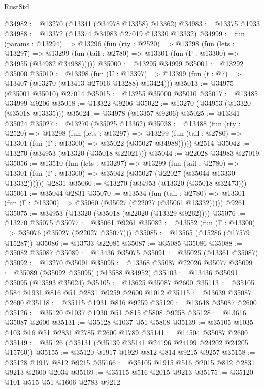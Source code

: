 \begin{lexlean}{RustStd}
\begin{coremodule}
@34982 := @13270 (@13341 (@34978 @13358) @13362)
@34983 := @13375 @1933
@34988 := @13372 (@13374 @34983 @27019 @13330 @13332)
@34999 := fun (params : @13294) =>
  @13296
    (fun (rty : @2520) =>
    @13298
      (fun (lets : @13297) =>
      @13299 (fun (tail : @2780) => @13301 (fun (Γ : @13300) => @34955 (@34982 @34988)))))
@35000 := @13295 @34999
@35001 := @13292 @35000
@35010 := @13398
    (fun (U : @13397) => @13399 (fun (t : @7) => @13407 (@13270 (@13413 @27016 @13288) @13424)))
@35013 := @34975 (@35001 @35010) @27014
@35015 := @13255 @35000 @35010
@35017 := @13485 @34999 @9206
@35018 := @13322 @9206
@35022 := @13270 (@34953 (@13320 (@35018 @13335)))
@35024 := @34978 (@13357 @9206)
@35025 := @13341 @35024
@35027 := @13270 (@35025 @13362)
@35038 := @13488
    (fun (rty : @2520) =>
    @13298
      (fun (lets : @13297) =>
      @13299 (fun (tail : @2780) => @13301 (fun (Γ : @13300) => @35022 (@35027 @34988)))))
    @2514
@35042 := @13270 (@34953 (@13320 (@35018 @22021)))
@35044 := @22028 @34983 @27019
@35056 := @13510
    (fun (lets : @13297) =>
    @13299
      (fun (tail : @2780) =>
      @13301 (fun (Γ : @13300) => @35042 (@35027 (@22027 (@35044 @13330 @13332))))))
    @2831
@35060 := @13270 (@34953 (@13320 (@35018 @32473)))
@35061 := @35044 @2831
@35070 := @13534
    (fun (tail : @2780) => @13301 (fun (Γ : @13300) => @35060 (@35027 (@22027 (@35061 @13332)))))
    @9261
@35075 := @34953 (@13320 (@35018 (@22020 (@13329 @9262))))
@35076 := @13270 @35075
@35077 := @35061 @9261
@35082 := @13552 (fun (Γ : @13300) => @35076 (@35027 (@22027 @35077)))
@35085 := @13565 (@15286 (@17579 @15287))
@35086 := @13733 @22085
@35087 := @35085 @35086
@35088 := @35082 @35087
@35089 := @13436 @35075
@35091 := @35025 (@13361 @35087)
@35092 := @13270 @35091
@35095 := @13368 @35087 @22026 @35077
@35099 := @35089 (@35092 @35095) (@13588 @34952)
@35103 := @13436 @35091 @35095 (@13593 @35024)
@35105 := @13625 @35087 @2600
@35113 := @35105 @584 @1931 @816 @51 @2831 @9259 @2600 @1012
@35115 := @13639 @35087 @2600
@35118 := @35115 @1931 @816 @9259
@35120 := @13648 @35087 @2600
@35126 := @35120 @1037 @1930 @51 @815 @5808 @9258
@35128 := @13616 @35087 @2600
@35131 := @35128 @1037 @51 @5808
@35139 := @35105 @1035 @103 @16 @51 @2831 @2785 @2600 @1789
@35141 := @14504 @35087 @2600
@35149 := @35126 (@35131 (@35139 @35141 @24196 @24199 @24202 @24205 @15760))
@35155 := @35120 @1917 @1929 @812 @814 @9215 @9257
@35158 := @35128 @1917 @812 @9215
@35166 := @35105 @1915 @516 @2015 @812 @2831 @9213 @2600 @2034
@35169 := @35115 @516 @2015 @9213
@35175 := @35120 @101 @515 @51 @1606 @2783 @9212

\end{coremodule}
\end{lexlean}
